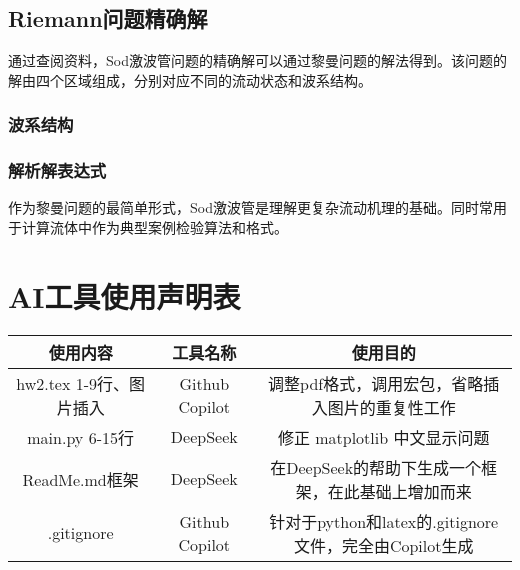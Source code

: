 \documentclass[UTF8]{ctexart}
\begin{document}
\subsection{Riemann问题精确解}
通过查阅资料，Sod激波管问题的精确解可以通过黎曼问题的解法得到。该问题的解由四个区域组成，分别对应不同的流动状态和波系结构。
\subsubsection{波系结构}



\subsubsection{解析解表达式}



作为黎曼问题的最简单形式，Sod激波管是理解更复杂流动机理的基础。同时常用于计算流体中作为典型案例检验算法和格式。



\newpage
\appendix
\section{AI工具使用声明表}
\begin{table}[H]
    \centering
    \begin{tabular}{c|c|c}
        \hline
        使用内容 & 工具名称 & 使用目的 \\ \hline
        hw2.tex 1-9行、图片插入 & Github Copilot & 调整pdf格式，调用宏包，省略插入图片的重复性工作 \\ 
        main.py 6-15行 & DeepSeek & 修正 matplotlib 中文显示问题 \\ 
        ReadMe.md框架 & DeepSeek & 在DeepSeek的帮助下生成一个框架，在此基础上增加而来 \\
        .gitignore & Github Copilot & 针对于python和latex的.gitignore文件，完全由Copilot生成  
    \end{tabular}
    \label{tab:AI_tools}
\end{table}
\end{document}
